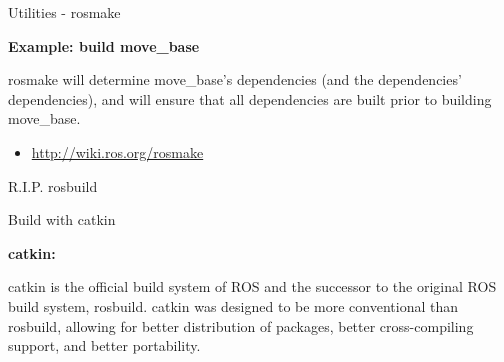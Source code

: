 \documentclass{beamer}
\begin{document}
\begin{frame}{Utilities - rosmake}
\begin{large}\textbf{Example: build move\_base}\end{large}


rosmake will determine move\_base's dependencies (and the dependencies' dependencies), and will ensure that all dependencies are built prior to building move\_base.\\	
\begin{itemize}
	\item \url{http://wiki.ros.org/rosmake}
\end{itemize}
\end{frame}
\begin{frame}
	\Huge{\centerline{R.I.P. rosbuild}}
\end{frame}	
\begin{frame}{Build with catkin}
	\begin{large}\textbf{catkin:}\end{large}
	\newline
	\newline
	catkin is the official build system of ROS and the successor to the original ROS build system, rosbuild.
	\newline
	\newline
	catkin was designed to be more conventional than rosbuild, allowing for better distribution of packages, better cross-compiling support, and better portability.
\end{frame}
\end{document}
